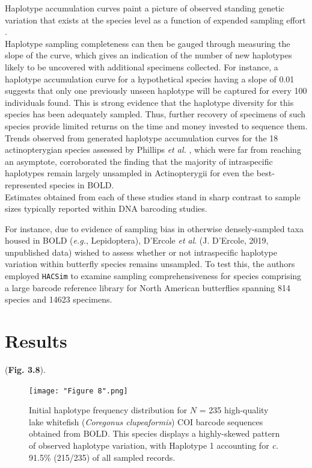 Haplotype accumulation curves paint a picture of observed standing genetic variation that exists at the species level as a function of expended sampling effort \cite{phillips2019incomplete, phillips2015exploration}. \\ Haplotype sampling completeness can then be gauged through measuring the slope of the curve, which gives an indication of the number of new haplotypes likely to be uncovered with additional specimens collected. For instance, a haplotype accumulation curve for a hypothetical species having a slope of 0.01 suggests that only one previously unseen haplotype will be captured for every 100 individuals found. This is strong evidence that the haplotype diversity for this species has been adequately sampled. Thus, further recovery of specimens of such species provide limited returns on the time and money invested to sequence them. Trends observed from generated haplotype accumulation curves for the 18 actinopterygian species assessed by Phillips \textit{et al.} \cite{phillips2015exploration}, which were far from reaching an asymptote, corroborated the finding that the majority of intraspecific haplotypes remain largely unsampled in Actinopterygii for even the best-represented species in BOLD. \\ Estimates obtained from each of these studies stand in sharp contrast to sample sizes typically reported within DNA barcoding studies. 




For instance, due to evidence of sampling bias in otherwise densely-sampled taxa housed in BOLD (\textit{e.g.}, Lepidoptera), D'Ercole \textit{et al}. (J. D'Ercole, 2019, unpublished data) wished to assess whether or not intraspecific haplotype variation within butterfly species remains unsampled. To test this, the authors employed {\tt HACSim} to examine sampling comprehensiveness for species comprising a large barcode reference library for North American butterflies spanning 814 species and 14623 specimens.

\section{Results}

(\textbf{Fig. 3.8}). 


\begin{figure}[H]

\centering

\texttt{[image: "Figure 8".png]}

\caption[Haplotype frequency barplot for Lake whitefish (\textit{Coregonus clupeaformis}.]{Initial haplotype frequency distribution for $N$ = 235 high-quality lake whitefish (\textit{Coregonus clupeaformis}) COI barcode sequences obtained from BOLD. This species displays a highly-skewed pattern of observed haplotype variation, with Haplotype 1 accounting for \textit{c.} 91.5\% (215/235) of all sampled records.}

\end{figure}

